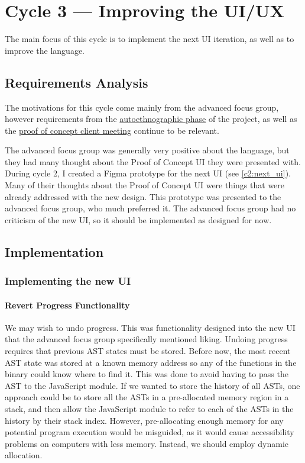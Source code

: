 \chapter{Cycle 3 --- Improving the UI/UX}
The main focus of this cycle is to implement the next UI iteration, as well as to improve the language. 

\section{Requirements Analysis}
The motivations for this cycle come mainly from the advanced focus group, however requirements from the \hyperref[sec:c1_autoethnography]{autoethnographic phase} of the project, as well as the \hyperref[eval:c1]{proof of concept client meeting} continue to be relevant. 

The advanced focus group was generally very positive about the language, but they had many thought about the Proof of Concept UI they were presented with. During cycle 2, I created a Figma prototype for the next UI (see \ref{c2:next_ui}). Many of their thoughts about the Proof of Concept UI were things that were already addressed with the new design. This prototype was presented to the advanced focus group, who much preferred it. The advanced focus group had no criticism of the new UI, so it should be implemented as designed for now. 

\section{Implementation}

\subsection{Implementing the new UI}

\subsubsection{Revert Progress Functionality}
We may wish to undo progress. This was functionality designed into the new UI that the advanced focus group specifically mentioned liking. Undoing progress requires that previous \ac{AST} states must be stored. Before now, the most recent \ac{AST} state was stored at a known memory address so any of the functions in the binary could know where to find it. This was done to avoid having to pass the AST to the JavaScript module. If we wanted to store the history of all \ac{AST}s, one approach could be to store all the \ac{AST}s in a pre-allocated memory region in a stack, and then allow the JavaScript module to refer to each of the \ac{AST}s in the history by their stack index. However, pre-allocating enough memory for any potential program execution would be misguided, as it would cause accessibility problems on computers with less memory. Instead, we should employ dynamic allocation. 

